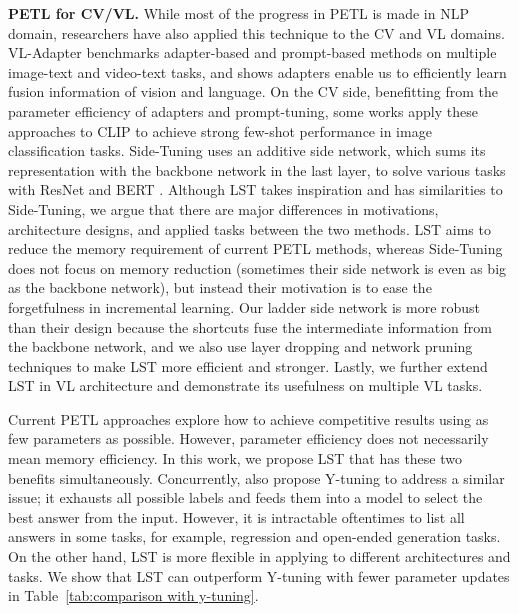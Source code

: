 \textbf{PETL for CV/VL.} While most of the progress in PETL is made in NLP domain, researchers have also applied this technique to the CV \cite{Rebuffi2018EfficientPO,Rebuffi2017LearningMV,Jia2022VisualPT,Zhang2019SideTuningNA,Zhou2021LearningTP,kim2022how,Zhang2021TipAdapterTC,He2022ParameterefficientFF} and VL \cite{Sung2021VLAdapterPT,Zhang2022HyperPELTUP,Zhou2021LearningTP,kim2022how,Zhang2021TipAdapterTC} domains. VL-Adapter \cite{Sung2021VLAdapterPT} benchmarks adapter-based and prompt-based methods on multiple image-text and video-text tasks, and shows adapters enable us to efficiently learn fusion information of vision and language. On the CV side, benefitting from the parameter efficiency of adapters and prompt-tuning, some works \cite{Zhou2021LearningTP,kim2022how,Zhang2021TipAdapterTC} apply these approaches to CLIP \cite{radford2021learningTV} to achieve strong few-shot performance in image classification tasks. Side-Tuning \cite{Zhang2019SideTuningNA} uses an additive side network, which sums its representation with the backbone network in the last layer, to solve various tasks with ResNet \cite{He2016DeepRL} and BERT \cite{Devlin2019BERTPO}. Although LST takes inspiration and has similarities to Side-Tuning, we argue that there are major differences in motivations, architecture designs, and applied tasks between the two methods. LST aims to reduce the memory requirement of current PETL methods, whereas Side-Tuning does not focus on memory reduction (sometimes their side network is even as big as the backbone network), but instead their motivation is to ease the forgetfulness in incremental learning. Our ladder side network is more robust than their design because the shortcuts fuse the intermediate information from the backbone network, and we also use layer dropping and network pruning techniques to make LST more efficient and stronger. Lastly, we further extend LST in VL architecture and demonstrate its usefulness on multiple VL tasks.

Current PETL approaches explore how to achieve competitive results using as few parameters as possible. However, parameter efficiency does not necessarily mean memory efficiency. In this work, we propose LST that has these two benefits simultaneously. Concurrently, \citet{Liu2022YTuningAE} also propose Y-tuning to address a similar issue; it exhausts all possible labels and feeds them into a model to select the best answer from the input. However, it is intractable oftentimes to list all answers in some tasks, for example, regression and open-ended generation tasks. On the other hand, LST is more flexible in applying to different architectures and tasks. We show that LST can outperform Y-tuning with fewer parameter updates in Table~\ref{tab:comparison with y-tuning}.

